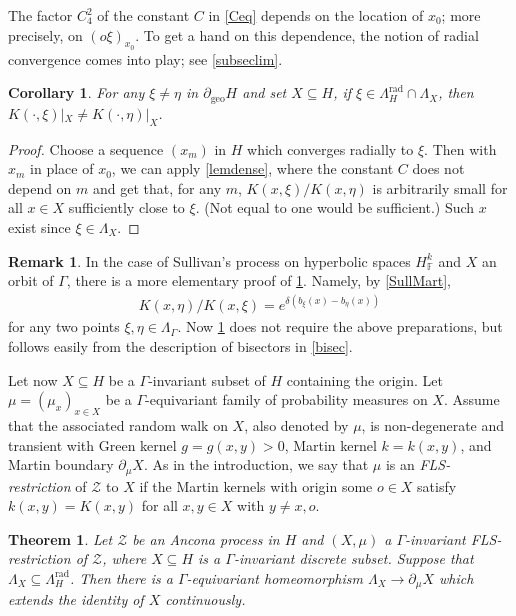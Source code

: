 \documentclass[12pt,a4paper]{amsart}
\numberwithin{equation}{section}
\newtheorem{cor}[equation]{Corollary}
\newtheorem{thm}[equation]{Theorem}
\theoremstyle{definition}
\newtheorem{rem}[equation]{Remark}
\DeclareMathOperator{\geo}{geo}
\DeclareMathOperator{\rad}{rad}
\def\F{\mathbb F}
\begin{document}
The factor $C_4^2$ of the constant $C$ in \eqref{Ceq} depends on the location of $x_0$; more precisely, on $(o\xi)_{x_0}$.
To get a hand on this dependence, the notion of radial convergence comes into play; see \cref{subseclim}.

\begin{cor}\label{dense}
For any $\xi\ne\eta$ in $\partial_{\geo}H$ and set $X\subseteq H$, if $\xi\in\Lambda_H^{\rad}\cap\Lambda_X$, then $K(\cdot,\xi)|_X\neq K(\cdot,\eta)|_X$.
\end{cor}

\begin{proof}
Choose a sequence $(x_m)$ in $H$ which converges radially to $\xi$.
Then with $x_m$ in place of $x_0$, we can apply \cref{lemdense}, where the constant $C$ does not depend on $m$ and get that, for any $m$, $K(x,\xi)/K(x,\eta)$ is arbitrarily small for all $x\in X$ sufficiently close to $\xi$. (Not equal to one would be sufficient.) Such $x$ exist since $\xi\in\Lambda_X$.
\end{proof}

\begin{rem}\label{lemdenss}
In the case of Sullivan's process on hyperbolic spaces $H^k_\F$ and $X$ an orbit of $\Gamma$, there is a more elementary proof of \cref{dense}.
Namely, by \cref{SullMart},
\begin{align*}
    K(x,\eta)/K(x,\xi)  = e^{\delta(b_\xi(x)-b_\eta(x))}
\end{align*}
for any two points $\xi,\eta\in\Lambda_\Gamma$.
Now \cref{dense} does not require the above preparations, but follows easily from the description of bisectors in \cref{bisec}.
\end{rem}

Let now $X\subseteq H$ be a $\Gamma$-invariant subset of $H$ containing the origin.
Let $\mu=(\mu_x)_{x\in X}$ be a $\Gamma$-equivariant family of probability measures on $X$.
Assume that the associated random walk on $X$, also denoted  by $\mu$, is non-degenerate and transient with Green kernel $g=g(x,y)>0$, Martin kernel $k=k(x,y)$, and Martin boundary $\partial_\mu X$.
As in the introduction, we say that $\mu$ is an \emph{FLS-restriction} of $\mathcal Z$ to $X$ if the Martin kernels with origin some $o \in X$ satisfy $k(x,y)=K(x,y)$ for all $x,y \in X$ with $y\neq x, o$.

\begin{thm}\label{Martin}
Let $\mathcal{Z}$ be an Ancona process in $H$ and $(X,\mu)$ a $\Gamma$-invariant FLS-restriction of $\mathcal{Z}$, where $X\subseteq H$ is a $\Gamma$-invariant discrete subset.
Suppose that $\Lambda_X\subseteq\Lambda_H^{\rad}$.
Then there is a $\Gamma$-equivariant homeomorphism $\Lambda_X\to\partial_\mu X$ which extends the identity of $X$ continuously.
\end{thm}
\end{document}
